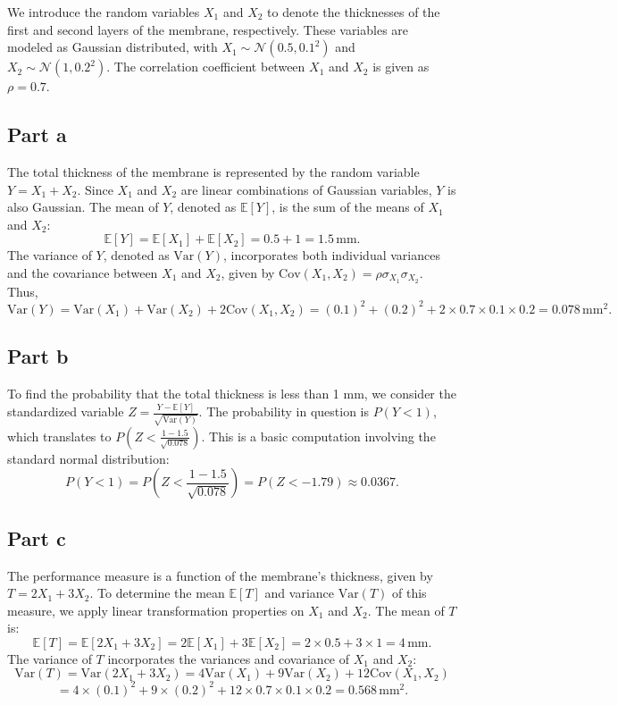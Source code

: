 \documentclass[12pt]{article}
\begin{document}
We introduce the random variables \(X_1\) and \(X_2\) to denote the thicknesses of the first and second layers of the membrane, respectively. These variables are modeled as Gaussian distributed, with \(X_1 \sim \mathcal{N}(0.5, 0.1^2)\) and \(X_2 \sim \mathcal{N}(1, 0.2^2)\). The correlation coefficient between \(X_1\) and \(X_2\) is given as \(\rho = 0.7\). 

\subsection*{Part a}
The total thickness of the membrane is represented by the random variable \(Y = X_1 + X_2\). Since \(X_1\) and \(X_2\) are linear combinations of Gaussian variables, \(Y\) is also Gaussian. The mean of \(Y\), denoted as \(\mathbb{E}[Y]\), is the sum of the means of \(X_1\) and \(X_2\): \[ \mathbb{E}[Y] = \mathbb{E}[X_1] + \mathbb{E}[X_2] = 0.5 + 1 = 1.5 \, \text{mm}. \] The variance of \(Y\), denoted as \(\text{Var}(Y)\), incorporates both individual variances and the covariance between \(X_1\) and \(X_2\), given by \(\text{Cov}(X_1, X_2) = \rho \sigma_{X_1} \sigma_{X_2}\). Thus, \[ \text{Var}(Y) = \text{Var}(X_1) + \text{Var}(X_2) + 2\text{Cov}(X_1, X_2) = (0.1)^2 + (0.2)^2 + 2 \times 0.7 \times 0.1 \times 0.2 = 0.078 \, \text{mm}^2. \]
\AnswerTag

\subsection*{Part b}
To find the probability that the total thickness is less than 1 mm, we consider the standardized variable \(Z = \frac{Y - \mathbb{E}[Y]}{\sqrt{\text{Var}(Y)}}\). The probability in question is \(P(Y < 1)\), which translates to \(P\left(Z < \frac{1 - 1.5}{\sqrt{0.078}}\right)\). This is a basic computation involving the standard normal distribution: \[ P(Y < 1) = P\left(Z < \frac{1 - 1.5}{\sqrt{0.078}}\right) = P(Z < -1.79) \approx 0.0367. \]
\AnswerTag

\subsection*{Part c}
The performance measure is a function of the membrane's thickness, given by \(T = 2X_1 + 3X_2\). To determine the mean \(\mathbb{E}[T]\) and variance \(\text{Var}(T)\) of this measure, we apply linear transformation properties on \(X_1\) and \(X_2\). The mean of \(T\) is: \[ \mathbb{E}[T] = \mathbb{E}[2X_1 + 3X_2] = 2\mathbb{E}[X_1] + 3\mathbb{E}[X_2] = 2 \times 0.5 + 3 \times 1 = 4 \, \text{mm}. \] The variance of \(T\) incorporates the variances and covariance of \(X_1\) and \(X_2\): \[ \text{Var}(T) = \text{Var}(2X_1 + 3X_2) = 4\text{Var}(X_1) + 9\text{Var}(X_2) + 12\text{Cov}(X_1, X_2)\] \[=4 \times (0.1)^2 + 9 \times (0.2)^2 + 12 \times 0.7 \times 0.1 \times 0.2 = 0.568 \, \text{mm}^2. \]
\AnswerTag
\end{document}
